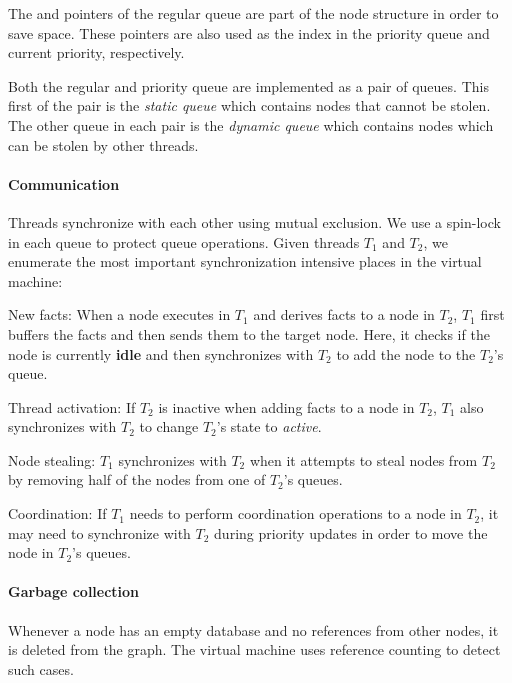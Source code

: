 The  and  pointers of the regular queue are
part of the node structure in order to save space. These pointers are
also used as the index in the priority queue and current priority,
respectively.

Both the regular and priority queue are implemented as a pair of
queues.  This first of the pair is the \emph{static queue} which
contains nodes that cannot be stolen.  The other queue in each pair is
the \emph{dynamic queue} which contains nodes which can be stolen by
other threads.

\paragraph{Communication}

Threads synchronize with each other using mutual exclusion. We use a spin-lock in
each queue to protect queue operations.
Given threads $T_1$ and $T_2$, we enumerate the most important
synchronization intensive places in the virtual machine:

\begin{tightdescription}
   \item[New facts:] When a node executes in $T_1$ and derives facts
   to a node in $T_2$, $T_1$ first buffers the facts 
   and then sends them to the target node. Here, it checks if the
   node is currently \textbf{idle} and then synchronizes with $T_2$ to add the
   node to the $T_2$'s queue.
   \item[Thread activation:] If $T_2$ is inactive when adding facts to a node in
   $T_2$, $T_1$ also synchronizes with $T_2$ to change $T_2$'s state to \emph{active}.
   \item[Node stealing:] $T_1$ synchronizes with $T_2$ when it attempts to steal
   nodes from $T_2$ by removing half of the nodes from one of $T_2$'s queues.
   \item[Coordination:] If $T_1$ needs to perform coordination operations
   to a node in $T_2$, it may need to synchronize with $T_2$ during priority
   updates in order to move the node in $T_2$'s queues.
\end{tightdescription}

\paragraph{Garbage collection}

Whenever a node has an empty database and no references from other nodes, it is
deleted from the graph. The virtual machine uses reference counting to detect
such cases.

